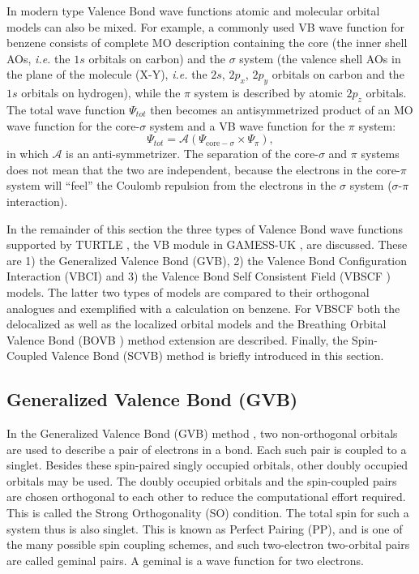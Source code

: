 In modern type Valence Bond wave functions atomic and molecular orbital models can also be mixed. For example, a commonly used VB wave function for benzene consists of complete MO description containing the core (the inner shell AOs, \textit{i.e.} the $1s$ orbitals on carbon) and the $\sigma$ system (the valence shell AOs in the plane of the molecule (X-Y), \textit{i.e.} the $2s$, $2p_x$, $2p_y$ orbitals on carbon and the $1s$ orbitals on hydrogen), while the $\pi$ system is described by atomic $2p_z$ orbitals. The total wave function $\Psi_{tot}$ then becomes an antisymmetrized product of an MO wave function for the core-$\sigma$ system and a VB wave function for the $\pi$ system:
\begin{equation}
\Psi_{tot} = \mathcal{A}(\Psi_{\mathrm{core}-\sigma} \times \Psi_{\pi}),
\label{ch1.eq.prodbenzene}
\end{equation}
in which $\mathcal{A}$ is an anti-symmetrizer. The separation of the core-$\sigma$ and $\pi$ systems does not mean that the two are independent, because the electrons in the core-$\pi$ system will ``feel'' the Coulomb repulsion from the electrons in the $\sigma$ system ($\sigma$-$\pi$ interaction).

In the remainder of this section the three types of Valence Bond wave functions supported by TURTLE \cite{turtle}, the VB module in GAMESS-UK \cite{gamess}, are discussed. These are 1) the Generalized Valence Bond (GVB), 2) the Valence Bond Configuration Interaction (VBCI) and 3) the Valence Bond Self Consistent Field (VBSCF \cite{vbscf1,vbscf2}) models. The latter two types of models are compared to their orthogonal analogues and exemplified with a calculation on benzene. For VBSCF both the delocalized as well as the localized orbital models and the Breathing Orbital Valence Bond (BOVB \cite{bovb1,bovb2,bovb3}) method extension are described. Finally, the Spin-Coupled Valence Bond (SCVB) method \cite{scvb1,scvb2,scvb3} is briefly introduced in this section.

\subsection{Generalized Valence Bond (GVB)}

In the Generalized Valence Bond (GVB) method \cite{jensen,gvb1,gvb2,gvb3,gvb4}, two non-orthogonal orbitals are used to describe a pair of electrons in a bond. Each such pair is coupled to a singlet. Besides these spin-paired singly occupied orbitals, other doubly occupied orbitals may be used. The doubly occupied orbitals and the spin-coupled pairs are chosen orthogonal to each other to reduce the computational effort required. This is called the Strong Orthogonality (SO) condition. The total spin for such a system thus is also singlet. This is known as Perfect Pairing (PP), and is one of the many possible spin coupling schemes, and such two-electron two-orbital pairs are called geminal pairs. A geminal is a wave function for two electrons. 

